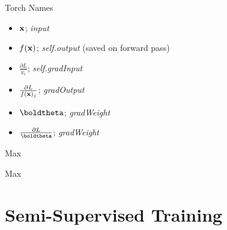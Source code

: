 \documentclass{beamer}
\begin{document}
\begin{frame}{Torch Names}

  \begin{itemize}
  \item $\mathbf{x}$; \textit{input}
  \item $f(\mathbf{x})$; \textit{self.output} (saved on forward pass)
  \item $\frac{\partial L}{x_i}$; \textit{self.gradInput}
  \item $\frac{\partial L}{f(\mathbf{x})_j}$; \textit{gradOutput}
  \item $\boldtheta$; \textit{gradWeight}
  \item $\frac{\partial L}{\boldtheta}$; \textit{gradWeight}
  \end{itemize}
\end{frame}

\begin{frame}{Max}
  
\end{frame}


\begin{frame}{Max}
  
\end{frame}

\section{Semi-Supervised Training}

\begin{frame}

\end{frame}
\end{document}
